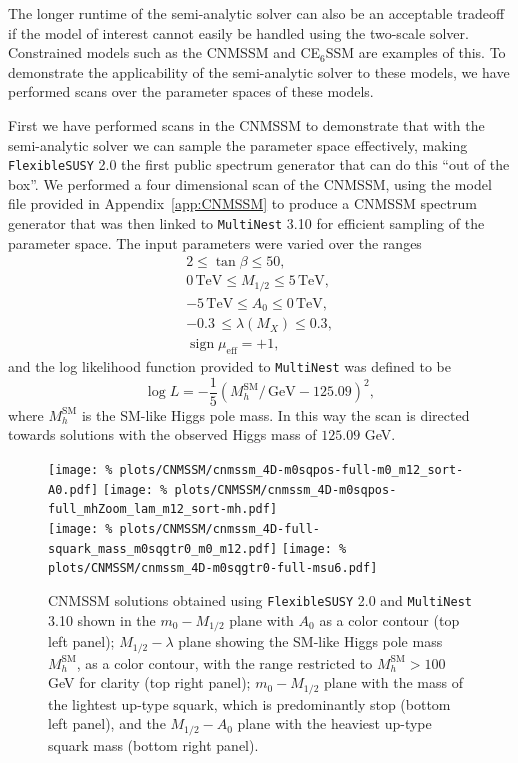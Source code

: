 \documentclass[final,3p,11pt,pdflatex]{elsarticle}
\makeatletter
\newcommand{\fs}{\texttt{FlexibleSUSY}\@\xspace}
\newcommand{\multinest}{\texttt{MultiNest}\@\xspace}
\newcommand{\fstwo}{\fs 2.0\@\xspace}
\newcommand{\ESSM}{E$_6$SSM\@\xspace}
\newcommand{\unit}[1]{\,\text{#1}}      %
\newcommand{\SM}{\ensuremath{\text{SM}}\xspace}
\newcommand{\appref}[1]{Appendix~\ref{#1}}
\newcommand{\azero}{\ensuremath{A_0}\xspace}
\newcommand{\mhalf}{\ensuremath{M_{1/2}}\xspace}
\newcommand{\mzero}{\ensuremath{m_0}\xspace}
\DeclareMathOperator{\sign}{sign}
\makeatother
\begin{document}
The longer runtime of the semi-analytic solver can also be an
acceptable tradeoff if the model of interest cannot easily be
handled using the two-scale solver.  Constrained models such as the
CNMSSM and C\ESSM are examples of this.  To demonstrate the applicability of
the semi-analytic solver to these models, we have performed
scans over the parameter spaces of these models.

First we have performed scans in the CNMSSM to demonstrate that with the
semi-analytic solver we can sample the parameter space effectively, making
\fstwo the first public spectrum generator that can do this ``out of the box''.
We performed a four dimensional scan of the CNMSSM, using the model file
provided in \appref{app:CNMSSM} to produce a CNMSSM spectrum generator that
was then linked to \multinest 3.10 for efficient sampling of the parameter
space.  The input parameters were varied over the ranges
\begin{gather}
  2 \leq \tan \beta \leq 50, \\
  0\unit{TeV} \leq \mhalf \leq 5\unit{TeV}, \\
  -5\unit{TeV} \leq \azero \leq 0\unit{TeV}, \\
  -0.3 \, \leq \lambda(M_X) \leq 0.3, \\
  \sign \mu_{\textrm{eff}}  = +1,
\end{gather}
and the log likelihood function provided to \multinest was defined to be
\begin{equation*}
  \log L = -\frac{1}{5}({M_h^{\SM}}/{\unit{GeV}} - 125.09)^2 ,
\end{equation*}
where $M_h^{\SM}$ is the SM-like Higgs pole mass.  In this way the
scan is directed towards solutions with the observed Higgs mass of
$125.09$ GeV\@.

\begin{figure}[tbh]
  \centering
  \texttt{[image: \%
    plots/CNMSSM/cnmssm\_4D-m0sqpos-full-m0\_m12\_sort-A0.pdf]}
   \texttt{[image: \%
    plots/CNMSSM/cnmssm\_4D-m0sqpos-full\_mhZoom\_lam\_m12\_sort-mh.pdf]} \\
  \texttt{[image: \%
    plots/CNMSSM/cnmssm\_4D-full-squark\_mass\_m0sqgtr0\_m0\_m12.pdf]}
   \texttt{[image: \%
    plots/CNMSSM/cnmssm\_4D-m0sqgtr0-full-msu6.pdf]}
   \caption{CNMSSM solutions obtained using \fstwo and \multinest 3.10
     shown in the $\mzero-\mhalf$ plane with $\azero$ as a color
     contour (top left panel); $\mhalf-\lambda$ plane showing the
     SM-like Higgs pole mass $M_h^{\SM} $, as a color contour, with
     the range restricted to $M_h^{\SM} > 100$ GeV for clarity (top
     right panel); $\mzero-\mhalf$ plane with the mass of the lightest
     up-type squark, which is predominantly stop (bottom left panel),
     and the $\mhalf-\azero$ plane with the heaviest up-type squark
     mass (bottom right panel).}
   \label{fig:cnmssm_solutions}
\end{figure}
\end{document}
